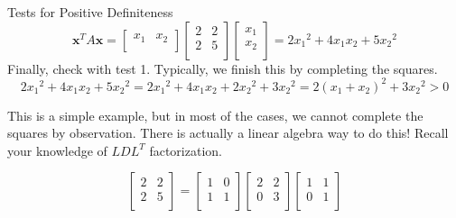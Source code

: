 \documentclass{beamer}
\begin{document}
\begin{frame}{Tests for Positive Definiteness}
    \begin{equation*}
    \mathbf{x}^TA\mathbf{x}=\left[ \begin{matrix}
        x_1&		x_2\\
    \end{matrix} \right] \left[ \begin{matrix}
        2&		2\\
        2&		5\\
    \end{matrix} \right] \left[ \begin{array}{c}
        x_1\\
        x_2\\
    \end{array} \right] =2{x_1}^2+4x_1x_2+5{x_2}^2
\end{equation*}
Finally, check with test 1. Typically, we finish this by completing the squares.
\begin{equation*}
    2{x_1}^2+4x_1x_2+5{x_2}^2=2{x_1}^2+4x_1x_2+2{x_2}^2+3{x_2}^2=2\left( x_1+x_2 \right) ^2+3{x_2}^2>0
\end{equation*}

This is a simple example, but in most of the cases, we cannot complete the squares by observation. There is actually a linear algebra way to do this! Recall your knowledge of $LDL^T$ factorization.

\begin{equation*}
    \left[ \begin{matrix}
        2&		2\\
        2&		5\\
    \end{matrix} \right] =\left[ \begin{matrix}
        1&		0\\
        1&		1\\
    \end{matrix} \right] \left[ \begin{matrix}
        2&		2\\
        0&		3\\
    \end{matrix} \right] \left[ \begin{matrix}
        1&		1\\
        0&		1\\
    \end{matrix} \right]
\end{equation*}


\end{frame}
\end{document}
